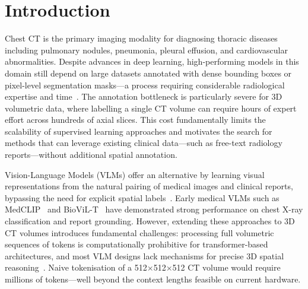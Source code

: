 \documentclass[lineno,referee,pdflatex,sn-mathphys-num]{sn-jnl}
\begin{document}

\maketitle


\section{Introduction}

Chest CT is the primary imaging modality for diagnosing thoracic diseases
including pulmonary nodules, pneumonia, pleural effusion, and
cardiovascular abnormalities. Despite advances in deep learning,
high-performing models in this domain still depend on large datasets
annotated with dense bounding boxes or pixel-level segmentation masks---a
process requiring considerable radiological expertise and
time~\cite{litjens2017}. The annotation bottleneck is particularly severe
for 3D volumetric data, where labelling a single CT volume can require
hours of expert effort across hundreds of axial slices. This cost
fundamentally limits the scalability of supervised learning approaches
and motivates the search for methods that can leverage existing clinical
data---such as free-text radiology reports---without additional spatial
annotation.

Vision-Language Models (VLMs) offer an alternative by learning visual
representations from the natural pairing of medical images and clinical
reports, bypassing the need for explicit spatial labels~\cite{clip2021}.
Early medical VLMs such as MedCLIP~\cite{medclip2022} and
BioViL-T~\cite{biovilt2023} have demonstrated strong performance on chest
X-ray classification and report grounding. However, extending these
approaches to 3D CT volumes introduces fundamental challenges: processing
full volumetric sequences of tokens is computationally prohibitive for
transformer-based architectures, and most VLM designs lack mechanisms for
precise 3D spatial reasoning~\cite{vilaM32024}. Naive tokenisation of a
512$\times$512$\times$512 CT volume would require millions of tokens---well
beyond the context lengths feasible on current hardware.
\end{document}
